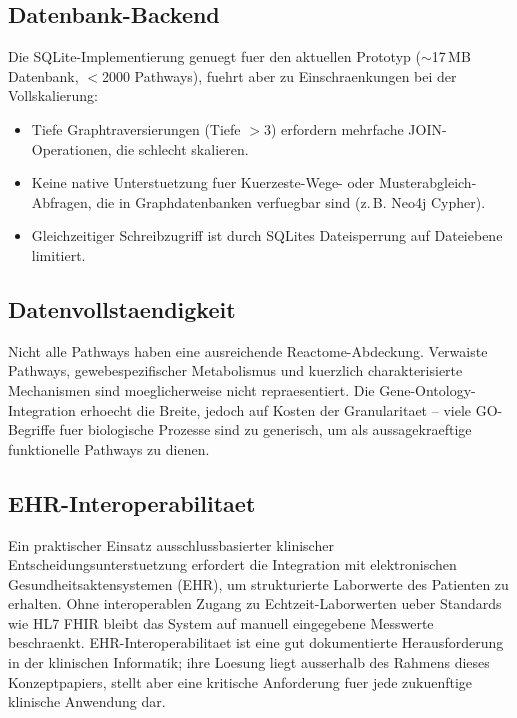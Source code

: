 \documentclass[12pt,a4paper]{article}
\begin{document}
\subsection{Datenbank-Backend}

Die SQLite-Implementierung genuegt fuer den aktuellen Prototyp ($\sim$17\,MB Datenbank, $<$2000 Pathways), fuehrt aber zu Einschraenkungen bei der Vollskalierung:

\begin{itemize}
    \item Tiefe Graphtraversierungen (Tiefe $>3$) erfordern mehrfache JOIN-Operationen, die schlecht skalieren.
    \item Keine native Unterstuetzung fuer Kuerzeste-Wege- oder Musterabgleich-Abfragen, die in Graphdatenbanken verfuegbar sind (z.\,B. Neo4j Cypher).
    \item Gleichzeitiger Schreibzugriff ist durch SQLites Dateisperrung auf Dateiebene limitiert.
\end{itemize}

\subsection{Datenvollstaendigkeit}

Nicht alle Pathways haben eine ausreichende Reactome-Abdeckung. Verwaiste Pathways, gewebespezifischer Metabolismus und kuerzlich charakterisierte Mechanismen sind moeglicherweise nicht repraesentiert. Die Gene-Ontology-Integration erhoecht die Breite, jedoch auf Kosten der Granularitaet -- viele GO-Begriffe fuer biologische Prozesse sind zu generisch, um als aussagekraeftige funktionelle Pathways zu dienen.

\subsection{EHR-Interoperabilitaet}

Ein praktischer Einsatz ausschlussbasierter klinischer Entscheidungsunterstuetzung erfordert die Integration mit elektronischen Gesundheitsaktensystemen (EHR), um strukturierte Laborwerte des Patienten zu erhalten. Ohne interoperablen Zugang zu Echtzeit-Laborwerten ueber Standards wie HL7 FHIR \citep{HL7FHIR2023} bleibt das System auf manuell eingegebene Messwerte beschraenkt. EHR-Interoperabilitaet ist eine gut dokumentierte Herausforderung in der klinischen Informatik; ihre Loesung liegt ausserhalb des Rahmens dieses Konzeptpapiers, stellt aber eine kritische Anforderung fuer jede zukuenftige klinische Anwendung dar.
\end{document}
